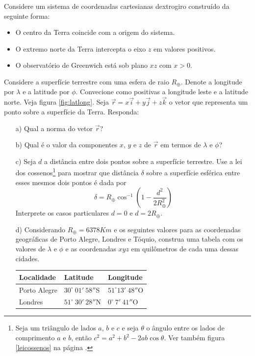\begin{exer}
Considere um sistema de coordenadas cartesianas dextrogiro construído da seguinte forma:

\begin{itemize}
\item O centro da Terra coincide com a origem do sistema.
\item O extremo norte da Terra intercepta o eixo $z$ em valores positivos.
\item O observatório de Greenwich está sob plano $xz$ com $x>0$.
\end{itemize}
Considere a superfície terrestre com uma esfera de raio $R_{\oplus}$. Denote a longitude por $\lambda$ e a latitude por $\phi$. Convecione como positivas a longitude leste  e a latitude norte. Veja figura \ref{fig:latlong}. Seja $\vec{r}=x\vec{i}+y\vec{j}+z\vec{k}$ o vetor que representa um ponto sobre a superfície da Terra. Responda:
\begin{itemize}
\item[a)] Qual a norma do vetor $\vec{r}$?
\item[b)] Qual é o valor da componentes $x$, $y$ e $z$ de $\vec{r}$ em termos de $\lambda$ e $\phi$?
\item[c)] Seja $d$ a distância entre dois pontos sobre a superfície terrestre. Use a lei dos cossenos\footnote{Seja um triângulo de lados $a$, $b$ e $c$ e seja $\theta$ o ângulo entre os lados de comprimento $a$ e $b$, então $c^2=a^2+b^2-2ab\cos\theta.$ Ver também figura \ref{leicossenos} na página \pageref{leicossenos}.} para mostrar que distância $\delta$ sobre a superfície esférica entre esses mesmos dois pontos é dada por
$$\delta=R_\oplus \cos^{-1}\left(1-\frac{d^2}{2R_\oplus^2}\right)$$
Interprete os casos particulares $d=0$ e $d=2R_\oplus$.
\item[d)] Considerando $R_\oplus=6378Km$ e os seguintes valores para as coordenadas geográficas de Porto Alegre, Londres e Tóquio, construa uma tabela com os valores de $\lambda$ e $\phi$ e as coordenadas $xyz$ em quilômetros de cada uma dessas cidades.
\begin{table}[h]
	\centering
		\begin{tabular}{|l|l|l|}
		\hline
	  Localidade & Latitude & Longitude\\
		\hline
		Porto Alegre & $30^\circ~ 01{'}~58{''}$S & $51^\circ  13{'}~48{''}$O\\
  	\hline
		Londres & $51^\circ~ 30{'}~28{''}$N & $0^\circ~ 7{'}~41{''}$O\\

\end{tabular}
\end{table}
\end{itemize}
\end{exer}
